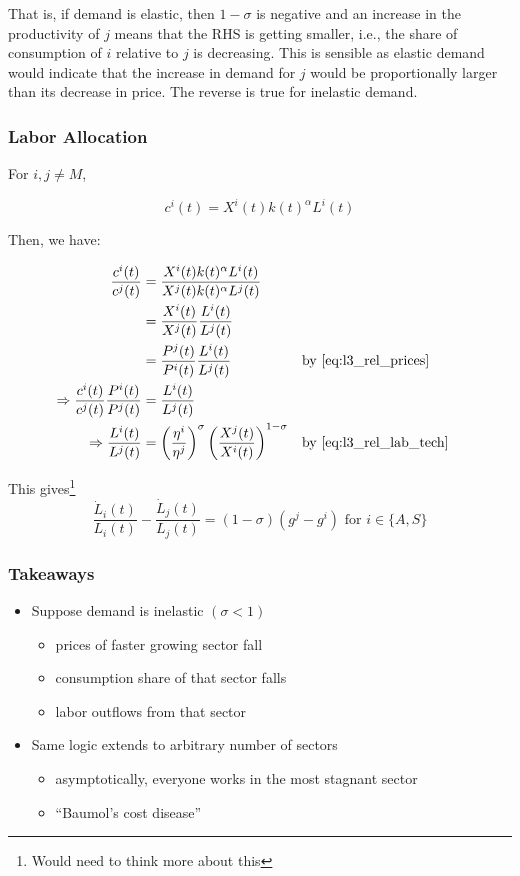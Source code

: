 \documentclass[10pt]{article}
\begin{document}
That is, if demand is elastic, then 
$1- \sigma$ is negative and an increase in the productivity of $j$
means that the RHS is getting smaller, i.e., the share of 
consumption of $i$ relative to $j$ is decreasing. This is sensible 
as elastic demand would indicate that the increase in demand 
for $j$ would be proportionally larger than its decrease in price. 
The reverse is true for inelastic demand.


\subsubsection{Labor Allocation}

For $i, j \neq M$,

$$
c^i(t)=X^i(t) k(t)^\alpha L^i(t)
$$

Then, we have:

\begin{align}
    \frac{c^i(t)}{c^j(t)}&=\frac{X^i(t) k(t)^\alpha L^i(t)}{X^j(t) k(t)^\alpha L^j(t)} \\
    &=\frac{X^i(t)}{X^j(t)}\frac{L^i(t)}{L^j(t)} \\
    &= \frac{P^j(t)}{P^i(t)} \frac{L^i(t)}{L^j(t)} && \text{by \eqref{eq:l3_rel_prices}} \\
    \Rightarrow \frac{c^i(t)}{c^j(t)}\frac{P^i(t)}{P^j(t)}&=\frac{L^i(t)}{L^j(t)} \\
    \Rightarrow \frac{L^i(t)}{L^j(t)}&=\left(\frac{\eta^i}{\eta^j}\right)^\sigma\left(\frac{X^j(t)}{X^i(t)}\right)^{1-\sigma} && \text{by \eqref{eq:l3_rel_lab_tech}}
\end{align}

This gives\footnote{\color{red}
Would need to think more about this 
\color{black}}
$$
\frac{\dot{L}_i(t)}{L_i(t)}-\frac{\dot{L}_j(t)}{L_j(t)}=(1-\sigma)\left(g^j-g^i\right) \text { for } i \in\{A, S\}
$$

\subsubsection{Takeaways}

\begin{itemize}
    \item Suppose demand is inelastic $(\sigma<1)$
        \begin{itemize}
            \item prices of faster growing sector fall
            \item consumption share of that sector falls
            \item labor outflows from that sector
        \end{itemize}
    \item Same logic extends to arbitrary number of sectors
        \begin{itemize}
            \item asymptotically, everyone works in the most stagnant sector 
            \item ``Baumol's cost disease''
        \end{itemize}
\end{itemize}
\end{document}

